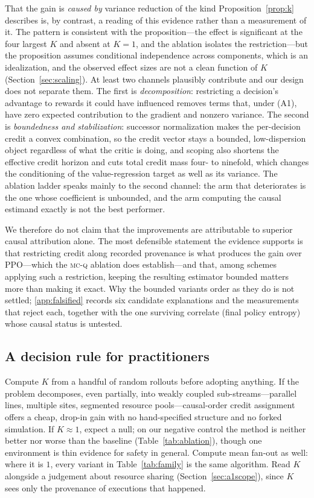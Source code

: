 \documentclass[review,authoryear,3p,times]{elsarticle}
\newcommand{\mcq}{\textsc{mc-q}}
\begin{document}
That the gain is \emph{caused by} variance reduction of the kind
Proposition~\ref{prop:k} describes is, by contrast, a reading of this evidence
rather than a measurement of it. The pattern is consistent with the
proposition---the effect is significant at the four largest $K$ and absent at
$K=1$, and the ablation isolates the restriction---but the proposition assumes
conditional independence across components, which is an idealization, and the
observed effect sizes are not a clean function of $K$
(Section~\ref{sec:scaling}). At least two channels plausibly contribute and our
design does not separate them. The first is \emph{decomposition}: restricting a
decision's advantage to rewards it could have influenced removes terms that,
under (A1), have zero expected contribution to the gradient and nonzero
variance. The second is \emph{boundedness and stabilization}: successor
normalization makes the per-decision credit a convex combination, so the credit
vector stays a bounded, low-dispersion object regardless of what the critic is
doing, and scoping also shortens the effective credit horizon and cuts total
credit mass four- to ninefold, which changes the conditioning of the
value-regression target as well as its variance. The ablation ladder speaks
mainly to the second channel: the arm that deteriorates is the one whose
coefficient is unbounded, and the arm computing the causal estimand exactly is
not the best performer.

We therefore do not claim that the improvements are attributable to superior
causal attribution alone. The most defensible statement the evidence supports is
that restricting credit along recorded provenance is what produces the gain over
PPO---which the \mcq{} ablation does establish---and that, among schemes
applying such a restriction, keeping the resulting estimator bounded matters
more than making it exact. Why the bounded variants order as they do is not
settled; \ref{app:falsified} records six candidate explanations and the
measurements that reject each, together with the one surviving correlate (final
policy entropy) whose causal status is untested.

\subsection{A decision rule for practitioners}

Compute $K$ from a handful of random rollouts before adopting anything. If the
problem decomposes, even partially, into weakly coupled sub-streams---parallel
lines, multiple sites, segmented resource pools---causal-order credit assignment
offers a cheap, drop-in gain with no hand-specified structure and no forked
simulation. If $K\approx1$, expect a null; on our negative control the method is
neither better nor worse than the baseline (Table~\ref{tab:ablation}), though
one environment is thin evidence for safety in general. Compute mean fan-out as
well: where it is $1$, every variant in Table~\ref{tab:family} is the same
algorithm. Read $K$ alongside a judgement about resource sharing
(Section~\ref{sec:a1scope}), since $K$ sees only the provenance of executions
that happened.
\end{document}
